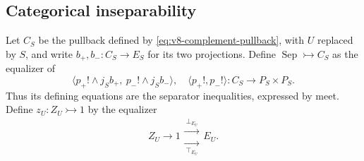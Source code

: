 \documentclass[11pt]{article}
\theoremstyle{definition}
\theoremstyle{remark}
\begin{document}
\subsection{Categorical inseparability}
\label{sec:categorical-representation}

Let $C_S$ be the pullback defined by
\eqref{eq:v8-complement-pullback}, with $U$ replaced by $S$,
and write $b_+,b_-:C_S\to E_S$ for its two projections.
Define $\operatorname{Sep}\rightarrowtail C_S$ as the equalizer of
\[
 \bigl\langle p_+!\wedge j_Sb_+,\ p_-!\wedge j_Sb_-\bigr\rangle,
 \quad \langle p_+!,p_-!\rangle:C_S\longrightarrow P_S\times P_S.
\]
Thus its defining equations are the separator inequalities,
expressed by meet. Define $z_U:Z_U\rightarrowtail1$ by the equalizer
\[
 Z_U\longrightarrow1
 \mathrel{\substack{\xrightarrow{\ \bot_{E_U}\ }\\[-.5ex]
                   \xrightarrow[\ \top_{E_U}\ ]{}}} E_U.
\]
\end{document}
